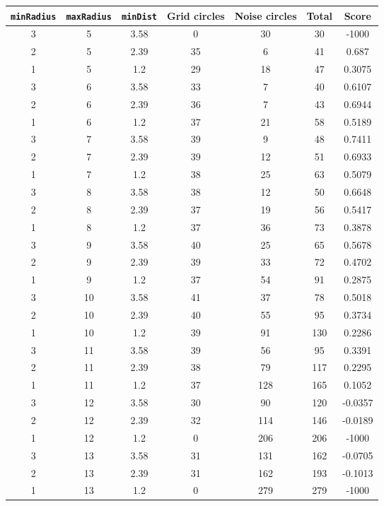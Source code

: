 \documentclass[letterpaper, 12pt]{article}
\begin{document}
\begin{longtable}{|c|c|c|c|c|c|c|}
\hline
\textbf{\texttt{minRadius}} & \textbf{\texttt{maxRadius}} & \textbf{\texttt{minDist}} & \textbf{Grid circles} & \textbf{Noise circles} & \textbf{Total} & \textbf{Score} \\
\hline
3 & 5 & 3.58 & 0 & 30 & 30 & -1000 \\
\hline
2 & 5 & 2.39 & 35 & 6 & 41 & 0.687 \\
\hline
1 & 5 & 1.2 & 29 & 18 & 47 & 0.3075 \\
\hline
3 & 6 & 3.58 & 33 & 7 & 40 & 0.6107 \\
\hline
2 & 6 & 2.39 & 36 & 7 & 43 & 0.6944 \\
\hline
1 & 6 & 1.2 & 37 & 21 & 58 & 0.5189 \\
\hline
3 & 7 & 3.58 & 39 & 9 & 48 & 0.7411 \\
\hline
2 & 7 & 2.39 & 39 & 12 & 51 & 0.6933 \\
\hline
1 & 7 & 1.2 & 38 & 25 & 63 & 0.5079 \\
\hline
3 & 8 & 3.58 & 38 & 12 & 50 & 0.6648 \\
\hline
2 & 8 & 2.39 & 37 & 19 & 56 & 0.5417 \\
\hline
1 & 8 & 1.2 & 37 & 36 & 73 & 0.3878 \\
\hline
3 & 9 & 3.58 & 40 & 25 & 65 & 0.5678 \\
\hline
2 & 9 & 2.39 & 39 & 33 & 72 & 0.4702 \\
\hline
1 & 9 & 1.2 & 37 & 54 & 91 & 0.2875 \\
\hline
3 & 10 & 3.58 & 41 & 37 & 78 & 0.5018 \\
\hline
2 & 10 & 2.39 & 40 & 55 & 95 & 0.3734 \\
\hline
1 & 10 & 1.2 & 39 & 91 & 130 & 0.2286 \\
\hline
3 & 11 & 3.58 & 39 & 56 & 95 & 0.3391 \\
\hline
2 & 11 & 2.39 & 38 & 79 & 117 & 0.2295 \\
\hline
1 & 11 & 1.2 & 37 & 128 & 165 & 0.1052 \\
\hline
3 & 12 & 3.58 & 30 & 90 & 120 & -0.0357 \\
\hline
2 & 12 & 2.39 & 32 & 114 & 146 & -0.0189 \\
\hline
1 & 12 & 1.2 & 0 & 206 & 206 & -1000 \\
\hline
3 & 13 & 3.58 & 31 & 131 & 162 & -0.0705 \\
\hline
2 & 13 & 2.39 & 31 & 162 & 193 & -0.1013 \\
\hline
1 & 13 & 1.2 & 0 & 279 & 279 & -1000 \\

\end{longtable}
\end{document}
